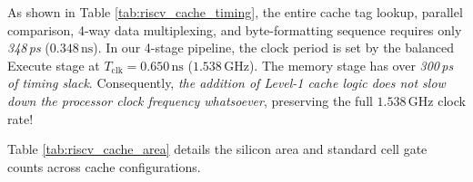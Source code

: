 \begin{table}[htbp]
\centering
{}
\caption{Gate-level delay breakdown of the Level-1 Cache hit path in ASAP7 7\,nm FinFET technology.}\label{tab:riscv_cache_timing}
\end{table}

As shown in Table \ref{tab:riscv_cache_timing}, the entire cache tag lookup, parallel comparison, 4-way data multiplexing, and byte-formatting sequence requires only \textit{348\,ps} ($0.348\,\text{ns}$). In our 4-stage pipeline, the clock period is set by the balanced Execute stage at $T_{\text{clk}} = 0.650\,\text{ns}$ ($1.538\,\text{GHz}$). The memory stage has over \textit{300\,ps of timing slack}. Consequently, \textit{the addition of Level-1 cache logic does not slow down the processor clock frequency whatsoever}, preserving the full $1.538\,\text{GHz}$ clock rate!

Table \ref{tab:riscv_cache_area} details the silicon area and standard cell gate counts across cache configurations.

